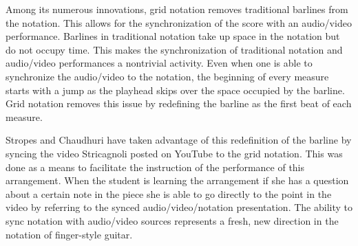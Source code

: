 \documentclass{tufte-handout}
\begin{document}

Among its numerous innovations, grid notation removes traditional barlines
from the notation. This allows for the synchronization of the score with an
audio/video performance. Barlines in traditional notation take up space in the
notation but do not occupy time. This makes the synchronization of traditional
notation and audio/video performances a nontrivial activity. Even when one is
able to synchronize the audio/video to the notation, the beginning of every
measure starts with a jump as the playhead skips over the space occupied by
the barline. Grid notation removes this issue by redefining the barline as the first beat of each measure.

Stropes and Chaudhuri have taken advantage of this redefinition of the barline by syncing the video Stricagnoli posted on YouTube to the grid notation. This was done as a means to facilitate the instruction of the performance of this arrangement. When the student is learning the arrangement if she has a question about a certain note in the piece she is able to go directly to the point in the video by referring to the synced audio/video/notation presentation. The ability to sync notation with audio/video sources represents a fresh, new direction in the notation of finger-style guitar.
\end{document}
